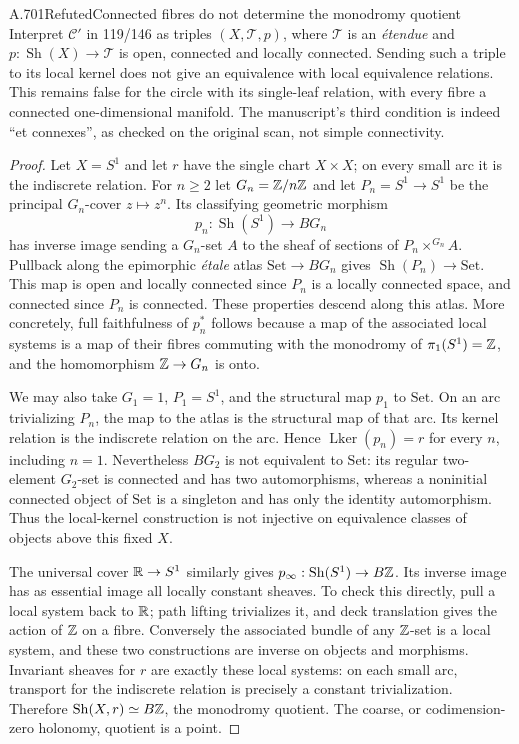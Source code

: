 \begin{saresult}{A.701}{Refuted}{Connected fibres do not determine the monodromy quotient}
Interpret $\mathcal C'$ in 119/146 as triples $(X,\mathcal T,p)$,
where $\mathcal T$ is an \emph{\'etendue} and
$p:\operatorname{Sh}(X)\to\mathcal T$ is open, connected and locally
connected. Sending such a triple to its local kernel does not give an
equivalence with local equivalence relations. This remains false for
the circle with its single-leaf relation, with every fibre a connected
one-dimensional manifold. The manuscript's third condition is indeed
``et connexes'', as checked on the original scan, not simple connectivity.
\end{saresult}
\begin{proof}
Let $X=S^1$ and let $r$ have the single chart $X\times X$; on every
small arc it is the indiscrete relation. For $n\ge2$ let
$G_n=\mathbb Z/n\mathbb Z$ and let $P_n=S^1\to S^1$ be the principal $G_n$-cover
$z\mapsto z^n$. Its classifying geometric morphism
\[
 p_n:\operatorname{Sh}(S^1)\longrightarrow BG_n
\]
has inverse image sending a $G_n$-set $A$ to the sheaf of sections of
$P_n\times^{G_n}A$. Pullback along the epimorphic \emph{\'etale} atlas
$\mathrm{Set}\to BG_n$ gives $\operatorname{Sh}(P_n)\to\mathrm{Set}$.
This map is open and locally connected since $P_n$ is a locally
connected space, and connected since $P_n$ is connected. These
properties descend along this atlas. More concretely, full faithfulness
of $p_n^*$ follows because a map of the associated local systems is a
map of their fibres commuting with the monodromy of $\pi_1(S^1)=\mathbb Z$,
and the homomorphism $\mathbb Z\to G_n$ is onto.

We may also take $G_1=1$, $P_1=S^1$, and the structural map $p_1$ to
$\mathrm{Set}$. On an arc trivializing $P_n$, the map to the atlas is
the structural map of that arc. Its kernel relation is the indiscrete
relation on the arc. Hence $\operatorname{Lker}(p_n)=r$ for every $n$,
including $n=1$. Nevertheless $BG_2$ is not equivalent to
$\mathrm{Set}$: its regular two-element $G_2$-set is connected and has
two automorphisms, whereas a noninitial connected object of
$\mathrm{Set}$ is a singleton and has only the identity automorphism.
Thus the local-kernel construction is not injective on equivalence
classes of objects above this fixed $X$.

The universal cover $\mathbb R\to S^1$ similarly gives
$p_\infty:\operatorname{Sh}(S^1)\to B\mathbb Z$. Its inverse image has as
essential image all locally constant sheaves. To check this directly,
pull a local system back to $\mathbb R$; path lifting trivializes it, and deck
translation gives the action of $\mathbb Z$ on a fibre. Conversely the
associated bundle of any $\mathbb Z$-set is a local system, and these two
constructions are inverse on objects and morphisms. Invariant sheaves
for $r$ are exactly these local systems: on each small arc, transport
for the indiscrete relation is precisely a constant trivialization.
Therefore $\operatorname{Sh}(X,r)\simeq B\mathbb Z$, the monodromy quotient.
The coarse, or codimension-zero holonomy, quotient is a point.


\end{proof}
